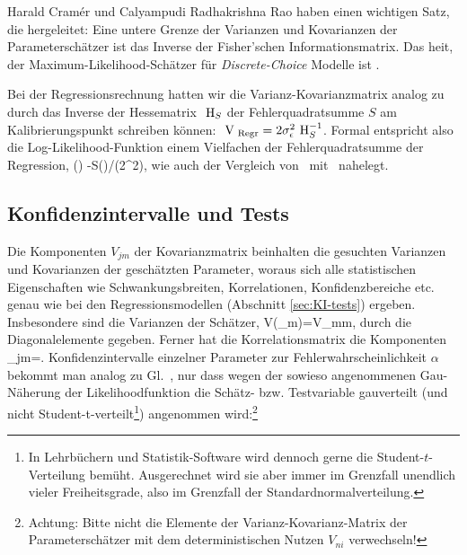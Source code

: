 \item
Harald Cram{\'e}r und Calyampudi Radhakrishna Rao haben einen wichtigen
Satz, die  hergeleitet: Eine untere
Grenze der Varianzen und Kovarianzen der 
Parametersch\"atzer ist das Inverse der Fisher'schen
Informationsmatrix. Das hei\3t, der Maximum-Likelihood-Sch\"atzer f\"ur
\emph{Discrete-Choice} Modelle ist .  

\item Bei der Regressionsrechnung hatten wir die
  Varianz-Kovarianzmatrix analog zu~ durch das
  Inverse der Hessematrix ${\mbox{ \textsf\textbf{H}}}_S$ der Fehlerquadratsumme $S$ 
am Kalibrierungs\-punkt
  schreiben k\"onnen: ${\mbox{ \textsf\textbf{V}}}_{{\mbox{ {\scriptsize \hspace{-0.2ex}Regr}}}}=2\sigma_{\epsilon}^2{\mbox{ \textsf\textbf{H}}}_S^{-1}$. Formal
  entspricht also die Log-Likeli\-hood-Funktion einem Vielfachen der
  Fehlerquadratsumme der Regression, 
\bdm
\tilL(\vecbeta)\hat{=}
  -S(\vecbeta)/(2\sigeps^2),
\edm
 wie auch der Vergleich
  von~ mit~ nahelegt.

\ei
\subsection{Konfidenzintervalle und Tests}


Die Komponenten $V_{jm}$ der Kovarianzmatrix beinhalten die gesuchten Varianzen und
Kovarianzen der gesch\"atzten Parameter, woraus sich alle statistischen
Eigenschaften wie Schwankungsbreiten, Korrelationen, Konfidenzbereiche
etc. genau wie bei den Regressionsmodellen
(Abschnitt \ref{sec:KI-tests}) ergeben. 
Insbesondere sind die Varianzen der Sch\"atzer, 
\be
\label{discrBetaVar}
V(\hatbeta_m)=V_{mm},
\ee
durch die
Diagonalelemente gegeben. Ferner hat die Korrelationsmatrix die Komponenten
\be
\label{corrBeta}
\rho_{jm}=.
\ee
Konfidenzintervalle einzelner Parameter zur Fehlerwahrscheinlichkeit
$\alpha$ bekommt man analog zu
Gl.~, nur dass wegen der sowieso angenommenen
Gau\3-N\"aherung der Likelihoodfunktion die Sch\"atz-
bzw. Testvariable gau\3verteilt (und nicht
Student-t-verteilt\footnote{In Lehrb\"uchern und 
  Statistik-Software  wird dennoch 
  gerne die Student-$t$-Verteilung bem\"uht. 
 Ausgerechnet wird sie aber immer im Grenzfall unendlich
  vieler Freiheitsgrade, also im Grenzfall der Standardnormalverteilung.})
angenommen wird:\footnote{Achtung: Bitte nicht die Elemente der
  Varianz-Kovarianz-Matrix der Parametersch\"atzer mit dem deterministischen
  Nutzen $V_{ni}$ verwechseln!}

